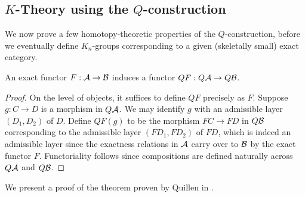 \subsection{$K$-Theory using the $Q$-construction}

We now prove a few homotopy-theoretic properties of the $Q$-construction,
before we eventually define $K_n$-groups corresponding to a given (skeletally small) exact category.

\begin{proposition}
An exact functor $F : \mathcal{A} \to \mathcal{B}$ induces a functor $QF : Q\mathcal{A} \to Q\mathcal{B}$.
\end{proposition}
\begin{proof}
On the level of objects, it suffices to define $QF$ precisely as $F$.
Suppose $g : C \to D$ is a morphism in $Q\mathcal{A}$. We may identify $g$ with an admissible layer $(D_1,D_2)$ of $D$.
Define $QF(g)$ to be the morphism $FC \to FD$ in $Q\mathcal{B}$ corresponding to the admissible layer $(FD_1,FD_2)$ of $FD$,
which is indeed an admissible layer since the exactness relations in $\mathcal{A}$ carry over to $\mathcal{B}$
by the exact functor $F$.
Functoriality follows since compositions are defined naturally across $Q\mathcal{A}$ and $Q\mathcal{B}$.
\end{proof}

We present a proof of the theorem proven by Quillen in \cite{Quillen1973}.

